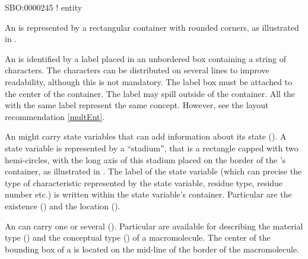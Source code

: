 \begin{glyphDescription}

\glyphSboTerm SBO:0000245 ! entity 

\glyphContainer An  is represented by a rectangular container with rounded corners, as illustrated in .

\glyphLabel An  is identified by a label placed in an unbordered box containing a string of characters.  The characters can be distributed on several lines to improve readability, although this is not mandatory.  The label box must be attached to the center of the container. 
The label may spill outside of the container. All the  with the same label represent the same concept. However, see the layout recommendation \ref{multEnt}.

\glyphAux An  might carry state variables that can add information about its state ().  A state variable is represented by a ``stadium'', that is a rectangle capped with two hemi-circles, with the long axis of this stadium placed on the border of the 's container, as illustrated in .  The label of the state variable (which can precise the type of characteristic represented by the state variable, residue type, residue number etc.) is written within the state variable's container. Particular  are the existence () and the location ().

An  can carry one or several  ().  Particular  are available for describing the material type () and the conceptual type () of a macromolecule.  The center of the bounding box of a  is located on the mid-line of the border of the macromolecule.
% 

\end{glyphDescription}

